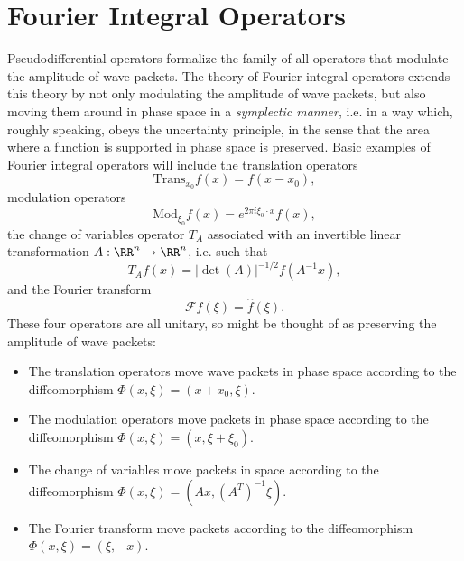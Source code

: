 \chapter{Fourier Integral Operators}

Pseudodifferential operators formalize the family of all operators that modulate the amplitude of wave packets. The theory of Fourier integral operators extends this theory by not only modulating the amplitude of wave packets, but also moving them around in phase space in a \emph{symplectic manner}, i.e. in a way which, roughly speaking, obeys the uncertainty principle, in the sense that the area where a function is supported in phase space is preserved. Basic examples of Fourier integral operators will include the translation operators
%
\[ \text{Trans}_{x_0} f(x) = f(x - x_0), \]
%
modulation operators
%
\[ \text{Mod}_{\xi_0} f(x) = e^{2 \pi i \xi_0 \cdot x} f(x), \]
%
the change of variables operator $T_A$ associated with an invertible linear transformation $A: \RR^n \to \RR^n$, i.e. such that
%
\[ T_A f(x) =  |\det(A)|^{-1/2} f(A^{-1} x), \]
%
and the Fourier transform
%
\[ \mathcal{F}f(\xi) = \widehat{f}(\xi). \]
%
These four operators are all unitary, so might be thought of as preserving the amplitude of wave packets:
%
\begin{itemize}
    \item The translation operators move wave packets in phase space according to the diffeomorphism $\Phi(x,\xi) = (x + x_0, \xi)$.

    \item The modulation operators move packets in phase space according to the diffeomorphism $\Phi(x,\xi) = (x,\xi + \xi_0)$.

    \item The change of variables move packets in space according to the diffeomorphism $\Phi(x,\xi) = (Ax, (A^T)^{-1} \xi)$.

    \item The Fourier transform move packets according to the diffeomorphism $\Phi(x,\xi) = (\xi,-x)$.
\end{itemize}
%

